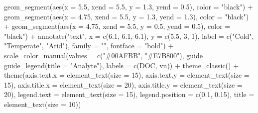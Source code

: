 \documentclass[
]{article}
\newenvironment{Shaded}{\begin{snugshade}}{\end{snugshade}}
\newcommand{\AttributeTok}[1]{\textcolor[rgb]{0.77,0.63,0.00}{#1}}
\newcommand{\DecValTok}[1]{\textcolor[rgb]{0.00,0.00,0.81}{#1}}
\newcommand{\FloatTok}[1]{\textcolor[rgb]{0.00,0.00,0.81}{#1}}
\newcommand{\FunctionTok}[1]{\textcolor[rgb]{0.00,0.00,0.00}{#1}}
\newcommand{\NormalTok}[1]{#1}
\newcommand{\SpecialCharTok}[1]{\textcolor[rgb]{0.00,0.00,0.00}{#1}}
\newcommand{\StringTok}[1]{\textcolor[rgb]{0.31,0.60,0.02}{#1}}
\begin{document}
\begin{Shaded}
\begin{Highlighting}[]
  \FunctionTok{geom\_segment}\NormalTok{(}\FunctionTok{aes}\NormalTok{(}\AttributeTok{x =} \FloatTok{5.5}\NormalTok{, }\AttributeTok{xend =} \FloatTok{5.5}\NormalTok{, }\AttributeTok{y =} \FloatTok{1.3}\NormalTok{, }\AttributeTok{yend =} \FloatTok{0.5}\NormalTok{), }\AttributeTok{color =} \StringTok{"black"}\NormalTok{) }\SpecialCharTok{+}
  \FunctionTok{geom\_segment}\NormalTok{(}\FunctionTok{aes}\NormalTok{(}\AttributeTok{x =} \FloatTok{4.75}\NormalTok{, }\AttributeTok{xend =} \FloatTok{5.5}\NormalTok{, }\AttributeTok{y =} \FloatTok{1.3}\NormalTok{, }\AttributeTok{yend =} \FloatTok{1.3}\NormalTok{), }\AttributeTok{color =} \StringTok{"black"}\NormalTok{) }\SpecialCharTok{+}
  \FunctionTok{geom\_segment}\NormalTok{(}\FunctionTok{aes}\NormalTok{(}\AttributeTok{x =} \FloatTok{4.75}\NormalTok{, }\AttributeTok{xend =} \FloatTok{5.5}\NormalTok{, }\AttributeTok{y =} \FloatTok{0.5}\NormalTok{, }\AttributeTok{yend =} \FloatTok{0.5}\NormalTok{), }\AttributeTok{color =} \StringTok{"black"}\NormalTok{) }\SpecialCharTok{+}
  \FunctionTok{annotate}\NormalTok{(}\StringTok{"text"}\NormalTok{,}
           \AttributeTok{x =} \FunctionTok{c}\NormalTok{(}\FloatTok{6.1}\NormalTok{, }\FloatTok{6.1}\NormalTok{, }\FloatTok{6.1}\NormalTok{),}
           \AttributeTok{y =} \FunctionTok{c}\NormalTok{(}\FloatTok{5.5}\NormalTok{, }\DecValTok{3}\NormalTok{, }\DecValTok{1}\NormalTok{),}
           \AttributeTok{label =} \FunctionTok{c}\NormalTok{(}\StringTok{"Cold"}\NormalTok{, }\StringTok{"Temperate"}\NormalTok{, }\StringTok{"Arid"}\NormalTok{),}
           \AttributeTok{family =} \StringTok{""}\NormalTok{, }\AttributeTok{fontface =} \StringTok{"bold"}\NormalTok{) }\SpecialCharTok{+}
  \FunctionTok{scale\_color\_manual}\NormalTok{(}\AttributeTok{values =} \FunctionTok{c}\NormalTok{(}\StringTok{"\#00AFBB"}\NormalTok{, }\StringTok{"\#E7B800"}\NormalTok{),}
                     \AttributeTok{guide =} \FunctionTok{guide\_legend}\NormalTok{(}\AttributeTok{title =} \StringTok{"Analyte"}\NormalTok{),}
                     \AttributeTok{labels =} \FunctionTok{c}\NormalTok{(}\StringTok{\textquotesingle{}DOC\textquotesingle{}}\NormalTok{, vn)) }\SpecialCharTok{+}
  \FunctionTok{theme\_classic}\NormalTok{() }\SpecialCharTok{+}
  \FunctionTok{theme}\NormalTok{(}\AttributeTok{axis.text.x =} \FunctionTok{element\_text}\NormalTok{(}\AttributeTok{size =} \DecValTok{15}\NormalTok{),}
        \AttributeTok{axis.text.y =} \FunctionTok{element\_text}\NormalTok{(}\AttributeTok{size =} \DecValTok{15}\NormalTok{),}
        \AttributeTok{axis.title.x =} \FunctionTok{element\_text}\NormalTok{(}\AttributeTok{size =} \DecValTok{20}\NormalTok{),}
        \AttributeTok{axis.title.y =} \FunctionTok{element\_text}\NormalTok{(}\AttributeTok{size =} \DecValTok{20}\NormalTok{),}
        \AttributeTok{legend.text =} \FunctionTok{element\_text}\NormalTok{(}\AttributeTok{size =} \DecValTok{15}\NormalTok{),}
        \AttributeTok{legend.position =} \FunctionTok{c}\NormalTok{(}\FloatTok{0.1}\NormalTok{, }\FloatTok{0.15}\NormalTok{),}
        \AttributeTok{title =} \FunctionTok{element\_text}\NormalTok{(}\AttributeTok{size =} \DecValTok{10}\NormalTok{))}
\end{Highlighting}
\end{Shaded}
\end{document}
